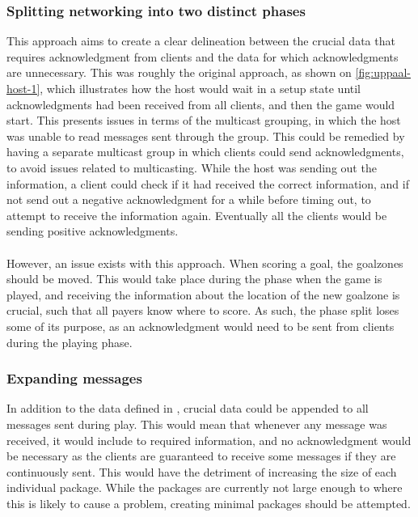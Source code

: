 \subsubsection{Splitting networking into two distinct phases}
This approach aims to create a clear delineation between the crucial data that requires acknowledgment from clients and the data for which acknowledgments are unnecessary.
This was roughly the original approach, as shown on \autoref{fig:uppaal-host-1}, which illustrates how the host would wait in a setup state until acknowledgments had been received from all clients, and then the game would start.
This presents issues in terms of the multicast grouping, in which the host was unable to read messages sent through the group.
This could be remedied by having a separate multicast group in which clients could send acknowledgments, to avoid issues related to multicasting.
While the host was sending out the information, a client could check if it had received the correct information, and if not send out a negative acknowledgment for a while before timing out, to attempt to receive the information again.
Eventually all the clients would be sending positive acknowledgments.
\\\\
However, an issue exists with this approach.
When scoring a goal, the goalzones should be moved.
This would take place during the phase when the game is played, and receiving the information about the location of the new goalzone is crucial, such that all payers know where to score.
As such, the phase split loses some of its purpose, as an acknowledgment would need to be sent from clients during the playing phase.

\subsubsection{Expanding messages}
In addition to the data defined in , crucial data could be appended to all messages sent during play.
This would mean that whenever any message was received, it would include to required information, and no acknowledgment would be necessary as the clients are guaranteed to receive some messages if they are continuously sent.
This would have the detriment of increasing the size of each individual package.
While the packages are currently not large enough to where this is likely to cause a problem, creating minimal packages  should be attempted.

